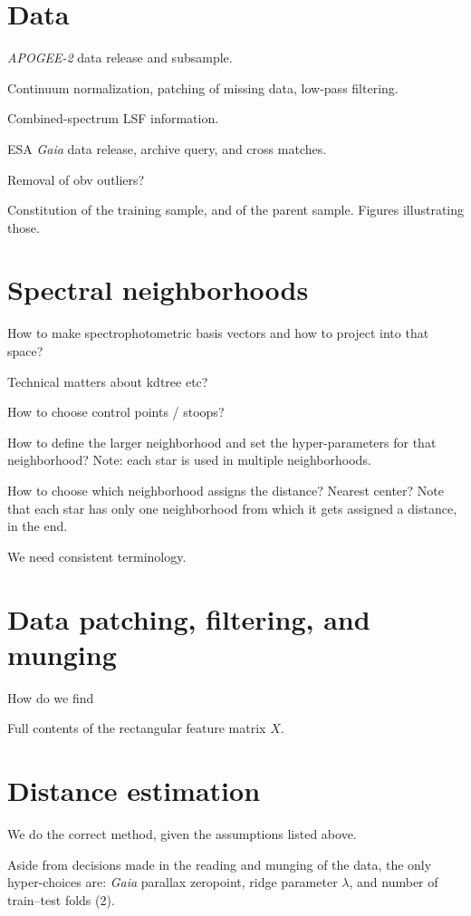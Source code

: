 \documentclass[modern]{aastex631}
\newcommand{\acronym}[1]{{\small{#1}}}
\newcommand{\project}[1]{\textsl{#1}}
\newcommand{\ESA}{\acronym{ESA}}
\newcommand{\Gaia}{\project{Gaia}}
\newcommand{\APOGEE}{\project{\acronym{APOGEE-2}}}
\begin{document}
\section{Data}

\APOGEE{} data release and subsample.

Continuum normalization, patching of missing data, low-pass filtering.

Combined-spectrum LSF information.

\ESA{} \Gaia{} data release, archive query, and cross matches.

Removal of obv outliers?

Constitution of the training sample, and of the parent sample. Figures illustrating those.

\section{Spectral neighborhoods}

How to make spectrophotometric basis vectors and how to project into that space?

Technical matters about kdtree etc?

How to choose control points / stoops?

How to define the larger neighborhood and set the hyper-parameters for that neighborhood? Note: each star is used in multiple neighborhoods.

How to choose which neighborhood assigns the distance? Nearest center? Note that each star has only one neighborhood from which it gets assigned a distance, in the end.

We need consistent terminology.

\section{Data patching, filtering, and munging}

How do we find

Full contents of the rectangular feature matrix $X$.

\section{Distance estimation}

We do the correct method, given the assumptions listed above.

Aside from decisions made in the reading and munging of the data, the
only hyper-choices are: \Gaia{} parallax zeropoint, ridge parameter
$\lambda$, and number of train--test folds (2).
\end{document}
